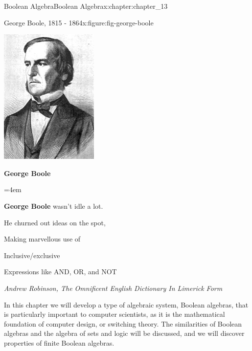 \documentclass[twoside,10pt,]{book}
\newcommand{\terminology}[1]{\textbf{#1}}
\numberwithin{equation}{section}
\newenvironment{poem}{\setlength{\parindent}{0em}}{}
\newcommand{\poemTitle}[1]{\begin{center}\large\textbf{#1}\end{center}}
\newenvironment{stanza}{\vspace{0.25 em}\hangindent=4em}{\vspace{1 em}}
\newcommand{\poemauthorleft}[1]{\vspace{-1em}\begin{flushleft}\textit{#1}\end{flushleft}}
\newcommand{\poemlineleft}[1]{{\raggedright{#1}\par}\vspace{-\parskip}}
\begin{document}
\begin{chapterptx}{Boolean Algebra}{}{Boolean Algebra}{}{}{x:chapter:chapter_13}
\begin{introduction}{}
\begin{figureptx}{George Boole, 1815 - 1864}{x:figure:fig-george-boole}{}
\begin{image}{0}{1}{0}
\includegraphics[width=\linewidth]{images/fig-george-boole.png}
\end{image}%
\tcblower
\end{figureptx}%
\begin{poem}%
\poemTitle{George Boole}
\begin{stanza}
\poemlineleft{\terminology{George Boole} wasn't idle a lot.}
\poemlineleft{He churned out ideas on the spot,}
\poemlineleft{Making marvellous use of}
\poemlineleft{Inclusive\slash{}exclusive}
\poemlineleft{Expressions like AND, OR, and NOT}
\end{stanza}
\poemauthorleft{Andrew Robinson, The Omnificent English Dictionary In Limerick Form}
\end{poem}
In this chapter we will develop a type of algebraic system, Boolean algebras, that is particularly important to computer scientists, as it is the mathematical foundation of computer design, or switching theory. The similarities of Boolean algebras and the algebra of sets and logic will be discussed, and we will discover properties of finite Boolean algebras.%

\end{introduction}
\end{chapterptx}
\end{document}
